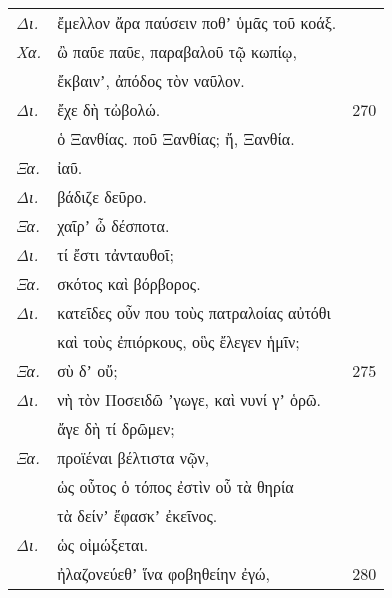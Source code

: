 \documentclass[13pt]{article}
\begin{document}
\begin{greek}
\begin{multicols}{2}
\begin{parcolumns}[colwidths={1=1.5em, 2=0.9\linewidth}]{2}
\end{parcolumns}
\end{multicols}

\newpage
\begin{spacing}{1.5}
\begin{tabularx}{\textwidth}{@{}lXr@{}}
\textit{Δι.} & ἔμελλον ἄρα παύσειν ποθʼ ὑμᾶς τοῦ κοάξ. &  \\
\textit{Χα.} & ὢ παῦε παῦε, παραβαλοῦ τῷ κωπίῳ, &  \\
& ἔκβαινʼ, ἀπόδος τὸν ναῦλον. & \\
\textit{Δι.} & \hspace{12em}ἔχε δὴ τὠβολώ. & 270 \\
& ὁ Ξανθίας. ποῦ Ξανθίας; ἤ, Ξανθία. &  \\
\textit{Ξα.} & ἰαῦ. &  \\
\textit{Δι.} & \hspace{2em}βάδιζε δεῦρο. &  \\
\textit{Ξα.} & \hspace{8em}χαῖρʼ ὦ δέσποτα. &  \\
\textit{Δι.} & τί ἔστι τἀνταυθοῖ; &  \\
\textit{Ξα.} & \hspace{8em}σκότος καὶ βόρβορος. &  \\
\textit{Δι.} & κατεῖδες οὖν που τοὺς πατραλοίας αὐτόθι &  \\
& καὶ τοὺς ἐπιόρκους, οὓς ἔλεγεν ἡμῖν; &  \\
\textit{Ξα.} & \hspace{15.5em}σὺ δʼ οὔ; & 275 \\
\textit{Δι.} & νὴ τὸν Ποσειδῶ ʼγωγε, καὶ νυνί γʼ ὁρῶ. &  \\
& ἄγε δὴ τί δρῶμεν; &  \\
\textit{Ξα.} & \hspace{7.5em}προϊέναι βέλτιστα νῷν, &  \\
& ὡς οὗτος ὁ τόπος ἐστὶν οὗ τὰ θηρία &  \\
& τὰ δείνʼ ἔφασκʼ ἐκεῖνος. &  \\
\textit{Δι.} & \hspace{10em}ὡς οἰμώξεται. &  \\
& ἠλαζονεύεθʼ ἵνα φοβηθείην ἐγώ, & 280 \\


\end{tabularx}
\end{spacing}


\end{greek}
\end{document}
